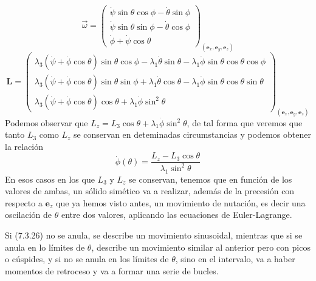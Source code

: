 \begin{equation} \label{6.1.1}
    \vec{\omega} = \left(\begin{matrix}
    \dot{\psi}\sin\theta\cos\phi - \dot{\theta}\sin\phi\\
    \dot{\psi}\sin\theta\sin\phi - \dot{\theta}\cos\phi\\
    \dot{\phi} + \dot{\psi}\cos\theta
    \end{matrix}\right)_{(\mathbf{e}_x,\mathbf{e}_y,\mathbf{e}_z)}
\end{equation}
\begin{equation} \label{6.1.1}
    \mathbf{L} = \left(\begin{matrix}
    \lambda_3(\dot{\psi}+\dot{\phi}\cos\theta)\sin\theta \cos\phi-\lambda_1\dot{\theta}\sin\theta -\lambda_1 \dot{\phi} \sin\theta\cos\theta\cos\phi\\
    \lambda_3(\dot{\psi}+\dot{\phi}\cos\theta)\sin\theta \sin\phi+\lambda_1\dot{\theta}\cos\theta-\lambda_1 \dot{\phi} \sin\theta\cos\theta\sin\theta\\
    \lambda_3(\dot{\psi}+\dot{\phi}\cos\theta)\cos\theta+\lambda_1 \dot{\phi} \sin^2\theta
    \end{matrix}\right)_{(\mathbf{e}_x,\mathbf{e}_y,\mathbf{e}_z)}
\end{equation}
Podemos observar que $L_z = L_3 \cos\theta + \lambda_1 \dot{\phi} \sin^2\theta$, de tal forma que veremos que tanto $L_3$ como $L_z$ se conservan en deteminadas circumstancias y podemos obtener la relación
\begin{equation} \label{6.1.1}
    \dot{\phi}(\theta) = \frac{L_z - L_3 \cos\theta}{\lambda_1\sin^2\theta}
\end{equation}
En esos casos en los que $L_3$ y $L_z$ se conservan, tenemos que en función de los valores de ambas, un sólido simético va a realizar, además de la precesión con respecto a $\mathbf{e}_z$ que ya hemos visto antes, un movimiento de nutación, es decir una oscilación de $\theta$ entre dos valores, aplicando las ecuaciones de Euler-Lagrange.

Si (7.3.26) no se anula, se describe un movimiento sinusoidal, mientras que si se anula en lo límites de $\theta$, describe un movimiento similar al anterior pero con picos o cúspides, y si no se anula en los límites de $\theta$, sino en el intervalo, va a haber momentos de retroceso y va a formar una serie de bucles.
